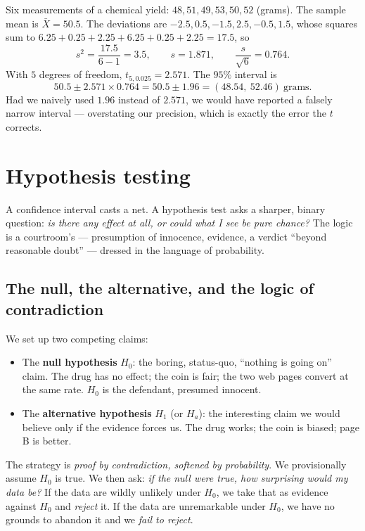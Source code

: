\begin{example}
\label{ch32:ex-tinterval}
Six measurements of a chemical yield: $48, 51, 49, 53, 50, 52$ (grams). The sample mean
is $\bar X = 50.5$. The deviations are $-2.5, 0.5, -1.5, 2.5, -0.5, 1.5$, whose squares
sum to $6.25+0.25+2.25+6.25+0.25+2.25 = 17.5$, so
\[
  s^2 = \frac{17.5}{6-1} = 3.5,\qquad s = 1.871,\qquad \frac{s}{\sqrt 6} = 0.764.
\]
With $5$ degrees of freedom, $t_{5,0.025} = 2.571$. The $95\%$ interval is
\[
  50.5 \pm 2.571 \times 0.764 = 50.5 \pm 1.96 = (48.54,\ 52.46)\ \text{grams}.
\]
Had we naively used $1.96$ instead of $2.571$, we would have reported a falsely narrow
interval --- overstating our precision, which is exactly the error the $t$ corrects.
\end{example}

\section{Hypothesis testing}
\label{ch32:testing}

A confidence interval casts a net. A hypothesis test asks a sharper, binary question:
\emph{is there any effect at all, or could what I see be pure chance?} The logic is a
courtroom's --- presumption of innocence, evidence, a verdict ``beyond reasonable
doubt'' --- dressed in the language of probability.

\subsection{The null, the alternative, and the logic of contradiction}

We set up two competing claims:

\begin{itemize}
  \item The \textbf{null hypothesis} $H_0$: the boring, status-quo, ``nothing is going
  on'' claim. The drug has no effect; the coin is fair; the two web pages convert at the
  same rate. $H_0$ is the defendant, presumed innocent.
  \item The \textbf{alternative hypothesis} $H_1$ (or $H_a$): the interesting claim we
  would believe only if the evidence forces us. The drug works; the coin is biased; page
  B is better.
\end{itemize}

The strategy is \emph{proof by contradiction, softened by probability}. We provisionally
assume $H_0$ is true. We then ask: \emph{if the null were true, how surprising would my
data be?} If the data are wildly unlikely under $H_0$, we take that as evidence against
$H_0$ and \emph{reject} it. If the data are unremarkable under $H_0$, we have no grounds
to abandon it and we \emph{fail to reject}.

